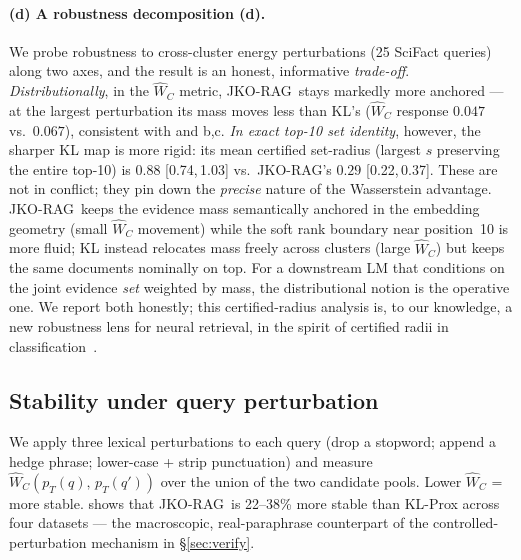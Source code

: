 \documentclass{article}
\theoremstyle{plain}
\newcommand{\mWdist}{\widehat{W}_C}
\newcommand{\jko}{\textsc{JKO-RAG}}
\newcommand{\CI}[2]{[#1,\,#2]}
\begin{document}
\paragraph{(d) A robustness decomposition (d).}
We probe robustness to cross-cluster energy perturbations (25 SciFact queries) along two axes, and the result is an honest, informative \emph{trade-off}. \emph{Distributionally}, in the $\mWdist$ metric, \jko\ stays markedly more anchored --- at the largest perturbation its mass moves less than KL's ($\mWdist$ response $0.047$ vs.\ $0.067$), consistent with  and b,c. \emph{In exact top-10 set identity}, however, the sharper KL map is more rigid: its mean certified set-radius (largest $s$ preserving the entire top-10) is $0.88$ \CI{0.74}{1.03} vs.\ \jko's $0.29$ \CI{0.22}{0.37}. These are not in conflict; they pin down the \emph{precise} nature of the Wasserstein advantage. \jko\ keeps the evidence mass semantically anchored in the embedding geometry (small $\mWdist$ movement) while the soft rank boundary near position~10 is more fluid; KL instead relocates mass freely across clusters (large $\mWdist$) but keeps the same documents nominally on top. For a downstream LM that conditions on the joint evidence \emph{set} weighted by mass, the distributional notion is the operative one. We report both honestly; this certified-radius analysis is, to our knowledge, a new robustness lens for neural retrieval, in the spirit of certified radii in classification~\cite{cohen2019certified}.

\subsection{Stability under query perturbation}
\label{sec:stability}

We apply three lexical perturbations to each query (drop a stopword; append a hedge phrase; lower-case + strip punctuation) and measure $\mWdist(p_T(q),\,p_T(q'))$ over the union of the two candidate pools. Lower $\mWdist$ = more stable.  shows that \jko\ is 22--38\% more stable than KL-Prox across four datasets --- the macroscopic, real-paraphrase counterpart of the controlled-perturbation mechanism in \S\ref{sec:verify}.
\end{document}
